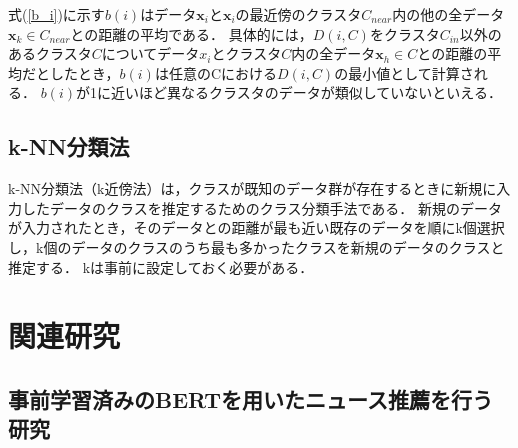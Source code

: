 \documentclass[12pt,a4j,dvipdfmx]{jreport}
\begin{document}
式(\ref{b_i})に示す$b(i)$はデータ$\bm{x}_i$と$\bm{x}_i$の最近傍のクラスタ$C_{near}$内の他の全データ$\bm{x}_k \in C_{near}$との距離の平均である．
具体的には，$D(i, C)$をクラスタ$C_{in}$以外のあるクラスタ$C$についてデータ$x_i$とクラスタ$C$内の全データ$\bm{x}_h \in C$との距離の平均だとしたとき，$b(i)$は任意のCにおける$D(i, C)$の最小値として計算される．
$b(i)$が1に近いほど異なるクラスタのデータが類似していないといえる．




\newpage

\section{k-NN分類法}
k-NN分類法（k近傍法）は，クラスが既知のデータ群が存在するときに新規に入力したデータのクラスを推定するためのクラス分類手法である\cite{aurellen20}．
新規のデータが入力されたとき，そのデータとの距離が最も近い既存のデータを順にk個選択し，k個のデータのクラスのうち最も多かったクラスを新規のデータのクラスと推定する．
kは事前に設定しておく必要がある．


\chapter{関連研究}
\label{chapter_related_studies}


\section{事前学習済みのBERTを用いたニュース推薦を行う研究}


\end{document}
